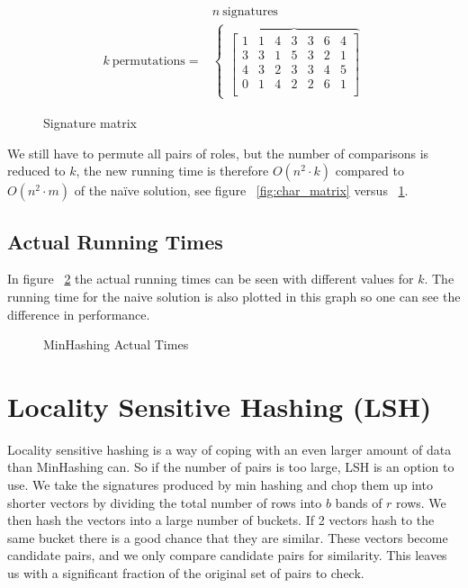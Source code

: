 \documentclass[a4paper,11pt]{article}
\begin{document}
\begin{figure}[!htpb]
    \begin{eqnarray*}
     & n \ \text{signatures} \\
     k \ \text{permutations} = & 
        \begin{cases}
        \overbrace{
        \begin{bmatrix}
            1 & 1 & 4 & 3 & 3 & 6 & 4\\
            3 & 3 & 1 & 5 & 3 & 2 & 1\\
            4 & 3 & 2 & 3 & 3 & 4 & 5\\
            0 & 1 & 4 & 2 & 2 & 6 & 1\\
        \end{bmatrix} 
        } 
        \end{cases}
    \end{eqnarray*}
    \caption{Signature matrix}
    \label{fig:signature_matrix}
\end{figure}

We still have to permute all pairs of roles, but the number of comparisons is reduced to $k$, the new running time is therefore $O(n^2 \cdot k)$ compared to $O(n^2 \cdot m)$ of the naïve solution, see figure ~\ref{fig:char_matrix} versus ~\ref{fig:signature_matrix}.

\subsection{Actual Running Times}
In figure ~\ref{fig:minhashing_at} the actual running times can be seen with different values for $k$. The running time for the naive solution is also plotted in this graph so one can see the difference in performance. \\


\begin{figure}[!htpb]
    \begin{center}
        
        \caption{MinHashing Actual Times}
        \label{fig:minhashing_at}
    \end{center}
\end{figure}


\section{Locality Sensitive Hashing (LSH)}
Locality sensitive hashing is a way of coping with an even larger amount of data than MinHashing can. So if the number of pairs is too large, LSH is an option to use. We take the signatures produced by min hashing and chop them up into shorter vectors by dividing the total number of rows into $b$ bands of $r$ rows. We then hash the vectors into a large number of buckets. If 2 vectors hash to the same bucket there is a good chance that they are similar. These vectors become candidate pairs, and we only compare candidate pairs for similarity. This leaves us with a significant fraction of the original set of pairs to check. \\
\end{document}
